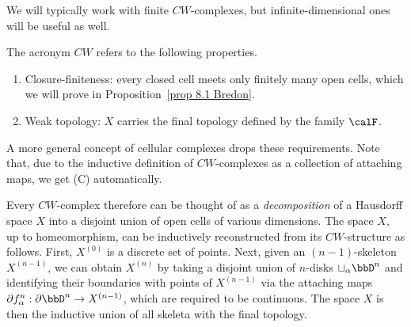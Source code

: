 We will typically work with finite $CW$-complexes, but infinite-dimensional ones will be useful as well.

\begin{rem}
The acronym $CW$ refers to the following properties.
\begin{enumerate}
    \item Closure-finiteness: every closed cell meets only finitely many open cells, which we will prove in Proposition~\ref{prop 8.1 Bredon}.
    \item Weak topology: $X$ carries the final topology defined by the family $\calF $.
\end{enumerate}
A  more general concept of cellular complexes drops these requirements. Note that, due to the inductive definition of $CW$-complexes as a collection of attaching maps, we get (C) automatically.
\end{rem}



Every $CW$-complex therefore can be thought of as a \emph{decomposition} of a Hausdorff space $X$ into a disjoint union of open cells of various dimensions. The space $X$, up to homeomorphism, can be inductively reconstructed from its $CW$-structure as follows. First, $X^{(0)}$ is a discrete set of points. Next, given an $(n-1)$-skeleton $X^{(n-1)}$, we can obtain $X^{(n)}$ by taking a disjoint union of $n$-disks $\sqcup_\alpha \bbD^n$ and identifying their boundaries with points of $X^{(n-1)}$ via the attaching maps $\partial f_\alpha^n:\partial \bbD^n\to X^{(n-1)}$, which are required to be continuous. The space $X$ is then the inductive union of all skeleta with the final topology.


